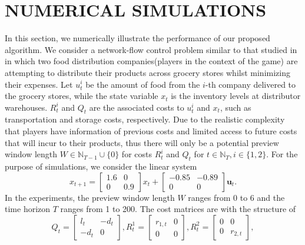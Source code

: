 \documentclass[letterpaper, 10 pt, conference]{ieeeconf}  %
\begin{document}
\section{NUMERICAL SIMULATIONS}\label{sec:numerical}
In this section, we numerically illustrate the performance of our proposed algorithm. We consider a network-flow control problem similar to that studied in \cite[Section VI]{zazo_dynamic_2016} in which two food distribution companies(players in the context of the game) are attempting to distribute their products across grocery stores whilst minimizing their expenses. Let $u_{t}^{i}$ be the amount of food from the $i$-th company delivered to the grocery stores, while the state variable $x_{t}$ is the inventory levels at distributor warehouses. $R_{t}^{i}$ and $Q_{t}$ are the associated costs to $u_{t}^{i}$ and $x_{t}$, such as transportation and storage costs, respectively. Due to the realistic complexity that players have information of previous costs and limited access to future costs that will incur to their products, thus there will only be a potential preview window length $W \in \mathbb{N}_{T-1}\cup \{0\}$ for costs $R_{t}^{i}$ and $Q_{t}$ for $t\in \mathbb{N}_{T}, i\in \{1,2\}$.
For the purpose of simulations, we consider the linear system
\begin{equation*}
    x_{t+1} = 
    \begin{bmatrix}
        1.6 & 0\\
        0 & 0.9
    \end{bmatrix}
    x_{t} + 
    \begin{bmatrix}
        -0.85 & -0.89\\
        0 & 0
    \end{bmatrix}\mathbf{u}_{t}.
\end{equation*}
In the experiments, the preview window length $W$ ranges from 0 to 6 and the time horizon $T$ ranges from 1 to 200. The cost matrices are with the structure of
\begin{equation*}
    Q_{t} = 
    \begin{bmatrix}
        l_{t} & -d_{t}\\
        -d_{t} & 0
    \end{bmatrix},
    R_{t}^{1} = 
    \begin{bmatrix}
        r_{1,t} & 0\\
        0 & 0
    \end{bmatrix},
    R_{t}^{2} = 
    \begin{bmatrix}
        0 & 0\\
        0 & r_{2,t}
    \end{bmatrix},
\end{equation*}
\end{document}
